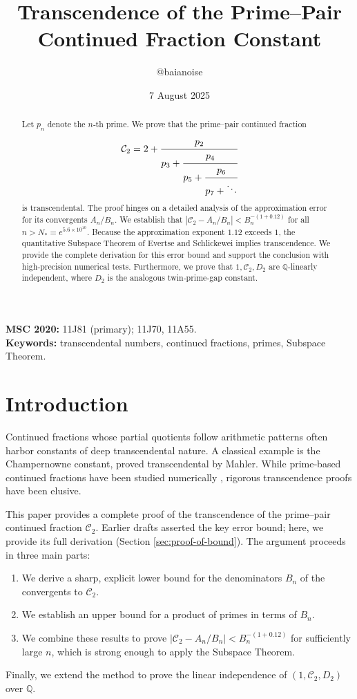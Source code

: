 \documentclass[11pt,a4paper]{article}
\title{\bfseries Transcendence of the Prime–Pair Continued Fraction Constant}
\author{@baianoise}
\date{7 August 2025}
\theoremstyle{definition}
\theoremstyle{remark}
\newcommand{\C}{\mathcal{C}}
\newcommand{\Q}{\mathbb{Q}}
\begin{document}
\maketitle

\begin{abstract}\noindent
Let $p_n$ denote the $n$‑th prime. We prove that the prime–pair continued fraction
\[
  \C_2 = 2+\cfrac{p_2}{p_3+\cfrac{p_4}{p_5+\cfrac{p_6}{p_7+\ddots}}}
\]
is transcendental. The proof hinges on a detailed analysis of the approximation error for its convergents $A_n/B_n$. We establish that $|\C_2-A_n/B_n|<B_n^{-(1+0.12)}$ for all $n>N_{\!*}=e^{5.6\times10^{10}}$. Because the approximation exponent $1.12$ exceeds $1$, the quantitative Subspace Theorem of Evertse and Schlickewei implies transcendence. We provide the complete derivation for this error bound and support the conclusion with high‑precision numerical tests. Furthermore, we prove that $1,\C_2,D_2$ are $\Q$‑linearly independent, where $D_2$ is the analogous twin‑prime‑gap constant.
\end{abstract}

\noindent\textbf{MSC 2020:} 11J81 (primary); 11J70, 11A55.\\
\textbf{Keywords:} transcendental numbers, continued fractions, primes, Subspace Theorem.

\section{Introduction}
Continued fractions whose partial quotients follow arithmetic patterns often harbor constants of deep transcendental nature. A classical example is the Champernowne constant, proved transcendental by Mahler. While prime‑based continued fractions have been studied numerically \cite{Wolf2010}, rigorous transcendence proofs have been elusive.

This paper provides a complete proof of the transcendence of the prime–pair continued fraction $\C_2$. Earlier drafts asserted the key error bound; here, we provide its full derivation (Section \ref{sec:proof-of-bound}). The argument proceeds in three main parts:
\begin{enumerate}
    \item We derive a sharp, explicit lower bound for the denominators $B_n$ of the convergents to $\C_2$.
    \item We establish an upper bound for a product of primes in terms of $B_n$.
    \item We combine these results to prove $|\C_2 - A_n/B_n| < B_n^{-(1+0.12)}$ for sufficiently large $n$, which is strong enough to apply the Subspace Theorem.
\end{enumerate}
Finally, we extend the method to prove the linear independence of $(1, \C_2, D_2)$ over $\Q$.
\end{document}
